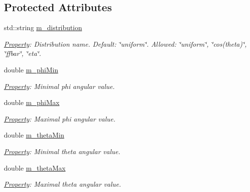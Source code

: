 \subsection*{Protected Attributes}
\begin{DoxyCompactItemize}
\item 
std::string \hyperlink{class_d_d4hep_1_1_simulation_1_1_geant4_isotrope_generator_a06a94fc1f4b02b112f0b56ced43b2f6b}{m\_\-distribution}
\begin{DoxyCompactList}\small\item\em \hyperlink{class_d_d4hep_1_1_property}{Property}: Distribution name. Default: \char`\"{}uniform\char`\"{}. Allowed: \char`\"{}uniform\char`\"{}, \char`\"{}cos(theta)\char`\"{}, \char`\"{}ffbar\char`\"{}, \char`\"{}eta\char`\"{}. \item\end{DoxyCompactList}\item 
double \hyperlink{class_d_d4hep_1_1_simulation_1_1_geant4_isotrope_generator_a87bd2c08ac991fe265d7a88d96edec48}{m\_\-phiMin}
\begin{DoxyCompactList}\small\item\em \hyperlink{class_d_d4hep_1_1_property}{Property}: Minimal phi angular value. \item\end{DoxyCompactList}\item 
double \hyperlink{class_d_d4hep_1_1_simulation_1_1_geant4_isotrope_generator_a72d8e77fc0bb2c1160d2266c02fa82ef}{m\_\-phiMax}
\begin{DoxyCompactList}\small\item\em \hyperlink{class_d_d4hep_1_1_property}{Property}: Maximal phi angular value. \item\end{DoxyCompactList}\item 
double \hyperlink{class_d_d4hep_1_1_simulation_1_1_geant4_isotrope_generator_adc75b47a005e8632d01d3db7b408de4c}{m\_\-thetaMin}
\begin{DoxyCompactList}\small\item\em \hyperlink{class_d_d4hep_1_1_property}{Property}: Minimal theta angular value. \item\end{DoxyCompactList}\item 
double \hyperlink{class_d_d4hep_1_1_simulation_1_1_geant4_isotrope_generator_a0e42113b732249962b03bb340f69b0a6}{m\_\-thetaMax}
\begin{DoxyCompactList}\small\item\em \hyperlink{class_d_d4hep_1_1_property}{Property}: Maximal theta angular value. \item\end{DoxyCompactList}\end{DoxyCompactItemize}



